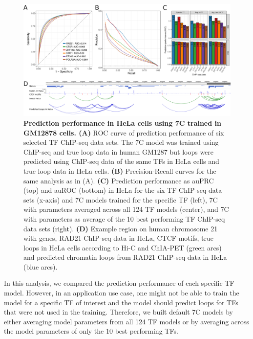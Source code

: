 \documentclass[a4paper,twoside=true,openright,parskip=full,chapterprefix=true,11pt,headings=normal,bibliography=totoc,listof=totoc,titlepage=on,captions=tableabove,draft=false]{scrreprt}
\theoremstyle{definition}
\theoremstyle{definition}
\theoremstyle{definition}
\theoremstyle{remark}
\begin{document}
\begin{figure}

{\centering \includegraphics[width=1\linewidth]{figures/loop_prediction/fig4_v04} 

}

\caption{\textbf{Prediction performance in HeLa cells using 7C
trained in GM12878 cells. (A)} ROC curve of prediction performance of
six selected TF ChIP-seq data sets. The 7C model was trained using
ChIP-seq and true loop data in human GM1287 but loops were predicted
using ChIP-seq data of the same TFs in HeLa cells and true loop data in
HeLa cells. \textbf{(B)} Precision-Recall curves for the same analysis
as in (A). \textbf{(C)} Prediction performance as auPRC (top) and auROC
(bottom) in HeLa for the six TF ChIP-seq data sets (x-axis) and 7C
models trained for the specific TF (left), 7C with parameters averaged
across all 124 TF models (center), and 7C with parameters as average of
the 10 best performing TF ChIP-seq data sets (right). \textbf{(D)}
Example region on human chromosome 21 with genes, RAD21 ChIP-seq data in
HeLa, CTCF motifs, true loops in HeLa cells according to Hi-C and
ChIA-PET (green arcs) and predicted chromatin loops from RAD21 ChIP-seq
data in HeLa (blue arcs).}\label{fig:LoopPred4}
\end{figure}

















In this analysis, we compared the prediction performance of each
specific TF model. However, in an application use case, one might not be
able to train the model for a specific TF of interest and the model
should predict loops for TFs that were not used in the training.
Therefore, we built default 7C models by either averaging model
parameters from all 124 TF models or by averaging across the model
parameters of only the 10 best performing TFs.
\end{document}
